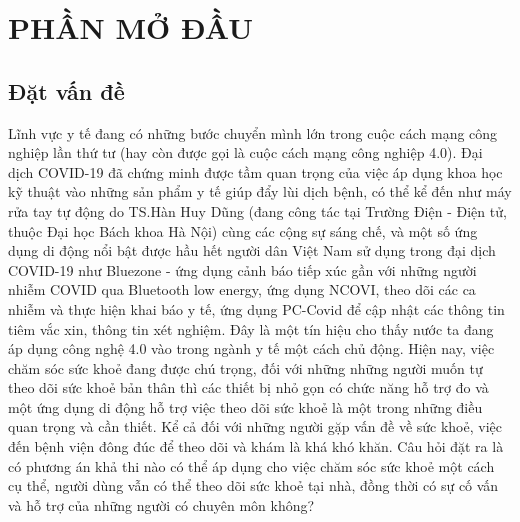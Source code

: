
\section*{PHẦN MỞ ĐẦU}
\subsection*{Đặt vấn đề}

Lĩnh vực y tế đang có những bước chuyển mình lớn trong cuộc cách mạng công nghiệp lần thứ tư 
(hay còn được gọi là cuộc cách mạng công nghiệp 4.0). Đại dịch COVID-19 đã chứng minh được tầm quan trọng của việc áp dụng
khoa học kỹ thuật vào những sản phẩm y tế giúp đẩy lùi dịch bệnh,
có thể kể đến như máy rửa tay tự động do TS.Hàn Huy Dũng (đang công tác tại Trường Điện - Điện tử, thuộc Đại học Bách khoa Hà Nội) 
\cite{ref_thay_dzung} cùng các cộng sự sáng chế, và một số ứng dụng di động
nổi bật được hầu hết người dân Việt Nam sử dụng trong đại dịch COVID-19 như Bluezone - ứng dụng cảnh báo tiếp xúc gần với
những người nhiễm COVID qua Bluetooth low energy, ứng dụng NCOVI, theo dõi các ca nhiễm và thực hiện khai báo y tế, ứng
dụng PC-Covid để cập nhật các thông tin tiêm vắc xin, thông tin xét nghiệm. Đây là một tín hiệu cho thấy nước ta đang áp
dụng công nghệ 4.0 vào trong ngành y tế một cách chủ động. Hiện nay, việc chăm sóc sức khoẻ đang được chú trọng, đối với 
những những người muốn tự theo dõi sức khoẻ bản thân
thì các thiết bị nhỏ gọn có chức năng hỗ trợ đo và một ứng dụng di động hỗ trợ việc theo dõi sức khoẻ là một trong những
điều quan trọng và cần thiết. Kể cả đối với những người gặp vấn đề về sức khoẻ, việc đến bệnh viện đông đúc để theo dõi
và khám là khá khó khăn. Câu hỏi đặt ra là có phương án khả thi nào có thể áp dụng cho việc chăm sóc sức khoẻ một cách cụ thể, 
người dùng vẫn có thể theo dõi sức khoẻ tại nhà, đồng thời có sự cố vấn và hỗ trợ của những người có chuyên môn không?

